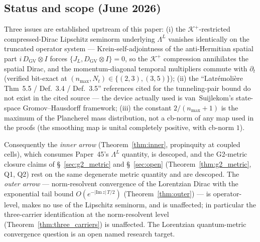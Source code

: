 \documentclass[11pt,a4paper]{article}
\theoremstyle{plain}
\theoremstyle{definition}
\newcommand{\nmax}{n_{\max}}
\newcommand{\Nt}{N_{t}}
\newcommand{\Krein}{\mathcal{K}}
\newcommand{\DGV}{D_{\mathrm{GV}}}
\newcommand{\JL}{J_{L}}
\newcommand{\Lprop}{\Lambda^{L}}
\newcommand{\Kplus}{\Krein^{+}}
\begin{document}
\begin{abstract}
\medskip
\noindent\emph{Place in the math.OA standalone series.} Ninth in the
GeoVac math.OA arc (siblings:\ Papers
38~\cite{paper38}, 39~\cite{paper39}, 40~\cite{paper40_unified},
42~\cite{paper42}, 43~\cite{paper43}, 44~\cite{paper44},
45~\cite{paper45}, 46~\cite{paper46}). The result composes Paper~45/46
verbatim on the inner arrow with standard
Reed--Simon~\cite{reed_simon_iv}\,\S~XIII.16 compact-to-non-compact-domain
resolvent machinery on the outer arrow.
\end{abstract}

\subsection*{Status and scope (June 2026)}
Three issues are established upstream of this paper: (i) the
$\Kplus$-restricted compressed-Dirac Lipschitz seminorm underlying
$\Lprop$ vanishes identically on the truncated operator system ---
Krein-self-adjointness of the anti-Hermitian spatial part
$i\,\DGV \otimes I$ forces $\{\JL, \DGV \otimes I\} = 0$, so the
$\Kplus$ compression annihilates the spatial Dirac, and the
momentum-diagonal temporal multipliers commute with $\partial_t$
(verified bit-exact at $(\nmax, \Nt) \in \{(2,3), (3,5)\}$); (ii)
the ``Latr\'emoli\`ere Thm~5.5 / Def.~3.4 / Def.~3.5'' references
cited for the tunneling-pair bound do not exist in the cited source
--- the device actually used is van~Suijlekom's state-space
Gromov--Hausdorff framework; (iii) the constant $2/(\nmax + 1)$ is
the maximum of the Plancherel mass distribution, not a cb-norm of
any map used in the proofs (the smoothing map is unital completely
positive, with cb-norm $1$).

Consequently the \emph{inner arrow} (Theorem~\ref{thm:inner},
propinquity at coupled cells), which consumes Paper~45's $\Lprop$
quantity, is descoped, and the G2-metric closure claims of
\S~\ref{sec:g2_metric} and \S~\ref{sec:open}
(Theorem~\ref{thm:g2_metric}, Q1, Q2) rest on the same degenerate
metric quantity and are descoped. The \emph{outer arrow} ---
norm-resolvent convergence of the Lorentzian Dirac with the
exponential tail bound $O(e^{-|\mathrm{Im}\,z|\,T/2})$
(Theorem~\ref{thm:outer}) --- is operator-level, makes no use of the
Lipschitz seminorm, and is unaffected; in particular the
three-carrier identification at the norm-resolvent level
(Theorem~\ref{thm:three_carriers}) is unaffected. The Lorentzian
quantum-metric convergence question is an open named research target.

\tableofcontents
\end{document}
